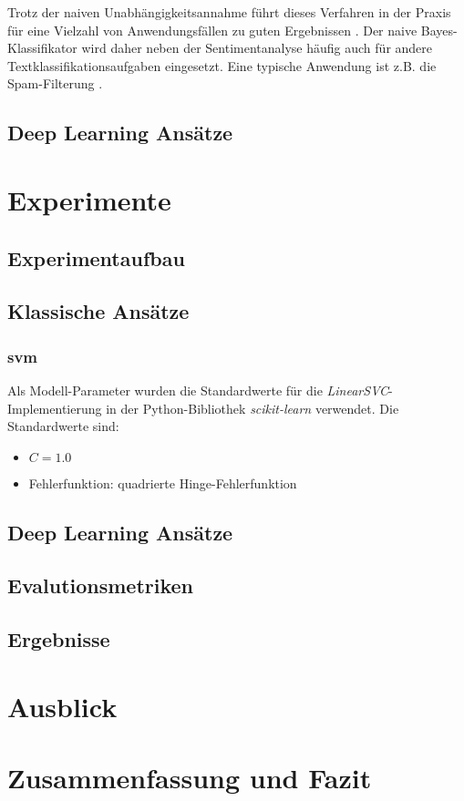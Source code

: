 \documentclass[researchlab,group,]{AIGpaper}
\begin{document}
Trotz der naiven Unabhängigkeitsannahme führt dieses Verfahren in der Praxis für eine Vielzahl von Anwendungsfällen zu guten Ergebnissen \cite{hand2001idiot}. Der naive Bayes-Klassifikator wird daher neben der Sentimentanalyse häufig auch für andere Textklassifikationsaufgaben eingesetzt. Eine typische Anwendung ist z.B. die Spam-Filterung \cite{sahami1998bayesian}.

\subsection{Deep Learning Ansätze}

\section{Experimente}

\subsection{Experimentaufbau}

\subsection{Klassische Ansätze}

\subsubsection{\gls{svm}}

Als Modell-Parameter wurden die Standardwerte für die \textit{LinearSVC}-Implementierung in der Python-Bibliothek \textit{scikit-learn} verwendet.
Die Standardwerte sind:

\begin{itemize}
    \item $C = 1.0$
    \item Fehlerfunktion: quadrierte Hinge-Fehlerfunktion
\end{itemize}

\subsection{Deep Learning Ansätze}

\subsection{Evalutionsmetriken}

\subsection{Ergebnisse}

\section{Ausblick}

\section{Zusammenfassung und Fazit}

\newpage
\addreferences

\end{document}
